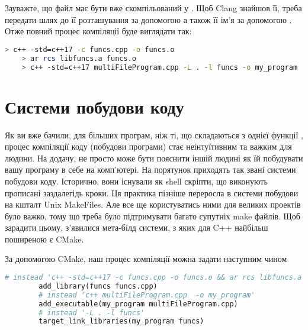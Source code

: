 \documentclass[12pt]{article}
\begin{document}
	Зауважте, що файл  має бути вже скомпільований у . Щоб Clang знайшов її, треба передати шлях до її розташування за допомогою  а також її ім'я за допомогою . Отже повний процес компіляції буде виглядати так:
	\begin{lstlisting}[language=bash]
	> c++ -std=c++17 -c funcs.cpp -o funcs.o
	> ar rcs libfuncs.a funcs.o
	> c++ -std=c++17 multiFileProgram.cpp -L . -l funcs -o my_program
	\end{lstlisting}

	\section{Системи побудови коду}
	Як ви вже бачили, для більших програм, ніж ті, що складаються з однієї функції , процес компіляції коду (побудови програми) стає неінтуїтивним та важким для людини. На додачу, не просто може бути пояснити іншій людині як їй побудувати вашу програму в себе на комп'ютері. На порятунок приходять так звані системи побудови коду. Історично, вони існували як shell скріпти, що виконують прописані заздалегідь кроки. Ця практика пізніше переросла в системи побудови на кшталт Unix MakeFiles. Але все ще користуватись ними для великих проектів було важко, тому що треба було підтримувати багато супутніх make файлів. Щоб зарадити цьому, з'явилися мета-білд системи, з яких для C++ найбільш поширеною є CMake. 
	
	За допомогою CMake, наш процес компіляції можна задати наступним чином
	\begin{lstlisting}[language=make]
		# instead 'c++ -std=c++17 -c funcs.cpp -o funcs.o && ar rcs libfuncs.a funcs.o'
		add_library(funcs funcs.cpp) 
		# instead 'c++ multiFileProgram.cpp  -o my_program'
		add_executable(my_program multiFileProgram.cpp) 
		# instead '-L . -l funcs'
		target_link_libraries(my_program funcs) 
	\end{lstlisting}
\end{document}
